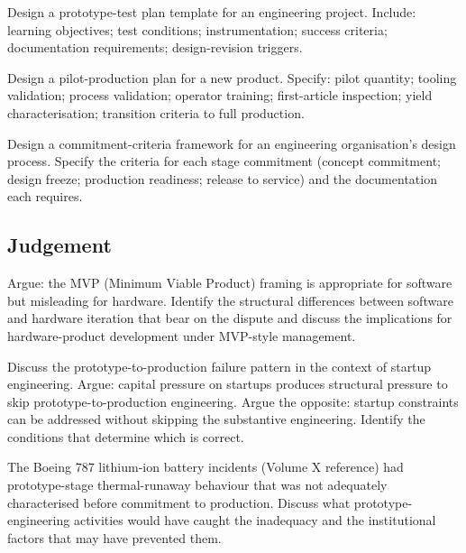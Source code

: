 \begin{exercise}
Design a prototype-test plan template for an engineering project. Include: learning objectives; test conditions; instrumentation; success criteria; documentation requirements; design-revision triggers.
\end{exercise}

\begin{exercise}
Design a pilot-production plan for a new product. Specify: pilot quantity; tooling validation; process validation; operator training; first-article inspection; yield characterisation; transition criteria to full production.
\end{exercise}

\begin{exercise}
Design a commitment-criteria framework for an engineering organisation's design process. Specify the criteria for each stage commitment (concept commitment; design freeze; production readiness; release to service) and the documentation each requires.
\end{exercise}

\subsection*{Judgement}

\begin{exercise}
Argue: the MVP (Minimum Viable Product) framing is appropriate for software but misleading for hardware. Identify the structural differences between software and hardware iteration that bear on the dispute and discuss the implications for hardware-product development under MVP-style management.
\end{exercise}

\begin{exercise}
Discuss the prototype-to-production failure pattern in the context of startup engineering. Argue: capital pressure on startups produces structural pressure to skip prototype-to-production engineering. Argue the opposite: startup constraints can be addressed without skipping the substantive engineering. Identify the conditions that determine which is correct.
\end{exercise}

\begin{exercise}
The Boeing 787 lithium-ion battery incidents (Volume X reference) had prototype-stage thermal-runaway behaviour that was not adequately characterised before commitment to production. Discuss what prototype-engineering activities would have caught the inadequacy and the institutional factors that may have prevented them.
\end{exercise}

